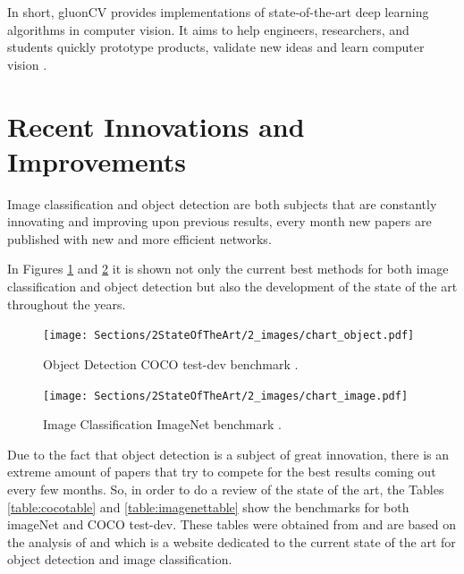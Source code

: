    In short, gluonCV provides implementations of state-of-the-art deep learning algorithms in computer vision. It aims to help engineers, researchers, and students quickly prototype products, validate new ideas and learn computer vision \cite{Guo2019}.

    

\newpage   


\section{Recent Innovations and Improvements}
\label{sec:state}

\par Image classification and object detection are both subjects that are constantly innovating and improving upon previous results, every month new papers are published with new and more efficient networks. 
\par In Figures \ref{fig:leaderboard_object} and \ref{fig:leaderboard_image} it is shown  not only the current best methods for both image classification and object detection but also the development of the state of the art throughout the years.





\begin{figure}[H]
    \centering
    \captionsetup{justification=centering}
    \texttt{[image: Sections/2StateOfTheArt/2\_images/chart\_object.pdf]}
    \caption[Object Detection COCO test-dev benchmark.]{Object Detection COCO test-dev benchmark \cite{papers_object}.}
    \label{fig:leaderboard_object}
\end{figure}

\begin{figure}[H]
    \centering
    \captionsetup{justification=centering}
    \texttt{[image: Sections/2StateOfTheArt/2\_images/chart\_image.pdf]}
    \caption[Image Classification ImageNet benchmark.]{Image Classification ImageNet benchmark \cite{papers_image}.}
    \label{fig:leaderboard_image}
\end{figure}



\par Due to the fact that object detection is a subject of great innovation, there is an extreme amount of papers that try to compete for the best results coming out every few months. So, in order to do a review of the state of the art, the Tables \ref{table:cocotable} and \ref{table:imagenettable} show the benchmarks for both imageNet and COCO test-dev. These tables were obtained from \cite{Ribeiro} and are based on the analysis of \cite{papers_image} and \cite{papers_object} which is a website dedicated to  the current state of the art for object detection and image classification.





